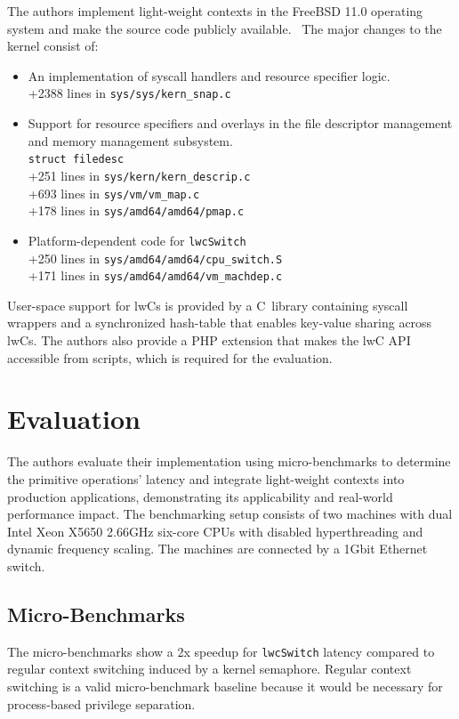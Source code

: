 \documentclass[10pt,twocolumn,a4paper]{article}
\begin{document}
The authors implement light-weight contexts in the FreeBSD 11.0 operating system and make the source code publicly available.~\cite{lwckernelrepo,lwclibsrepo} %
The major changes to the kernel consist of:
\begin{itemize}[nosep]
  \item An implementation of syscall handlers and resource specifier logic.\\
  +2388 lines in \texttt{sys/sys/kern\_snap.c}
  \item Support for resource specifiers and overlays in the file descriptor management and memory management subsystem.\\
  \lstinline{struct filedesc}\\
  +251 lines in \texttt{sys/kern/kern\_descrip.c}\\
  +693 lines in \texttt{sys/vm/vm\_map.c}\\
  +178 lines in \texttt{sys/amd64/amd64/pmap.c}
  \item Platform-dependent code for \lstinline{lwcSwitch}\\
  +250 lines in \texttt{sys/amd64/amd64/cpu\_switch.S}\\
  +171 lines in \texttt{sys/amd64/amd64/vm\_machdep.c}
\end{itemize}

User-space support for lwCs is provided by a C~library containing syscall wrappers and a synchronized hash-table that enables key-value sharing across lwCs.
The authors also provide a PHP extension that makes the lwC API accessible from scripts, which is required for the evaluation.

\section{Evaluation}\label{eval}
The authors evaluate their implementation using micro-benchmarks to determine the primitive operations' latency
and integrate light-weight contexts into production applications, demonstrating its applicability and real-world performance impact.
The benchmarking setup consists of two machines with dual Intel Xeon X5650 2.66GHz six-core CPUs with disabled hyperthreading and dynamic frequency scaling.
The machines are connected by a 1Gbit Ethernet switch.
\cite{lwcpaper}

\subsection{Micro-Benchmarks}
The micro-benchmarks show a 2x speedup for \lstinline{lwcSwitch} latency compared to regular context switching induced by a kernel semaphore.
Regular context switching is a valid micro-benchmark baseline because it would be necessary for process-based privilege separation.
\cite{lwcpaper}
\end{document}
